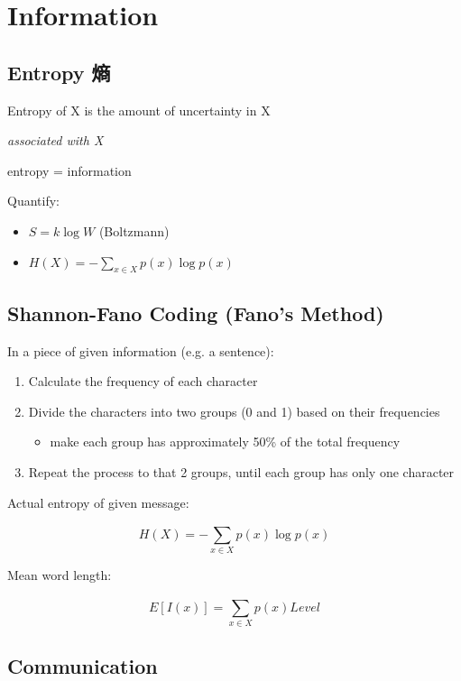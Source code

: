 \documentclass[a4paper, openany]{book}
\begin{document}
\section{Information}

\subsection{Entropy 熵}

Entropy of X is the amount of uncertainty in X

\emph{associated with X}

entropy = information

Quantify:

\begin{itemize}
  \item \(S = \mathit{k} \log W\) (Boltzmann)
  \item \(H ( X ) = -\sum_{\mathit{x}\in X}^{} p ( \mathit{x} ) \log p ( \mathit{x} )\)
\end{itemize}

\subsection{Shannon-Fano Coding (Fano's
Method)}

In a piece of given information (e.g. a sentence):

\begin{enumerate}
  \item Calculate the frequency of each character
  \item Divide the characters into two groups (0 and 1) based on their
  frequencies
  \begin{itemize}
    \item make each group has approximately 50\% of the total frequency
  \end{itemize}
  \item Repeat the process to that 2 groups, until each group has only one
  character
\end{enumerate}

Actual entropy of given message:

\[H ( X ) = -\sum_{\mathit{x}\in X}^{} p ( \mathit{x} ) \log p ( \mathit{x} )\]

Mean word length:

\[E\left [ \mathit{I} ( \mathit{x} )  \right ] =  \sum_{\mathit{x}\in X}^{} p ( \mathit{x} ) Level\]

\subsection{Communication}
\end{document}
